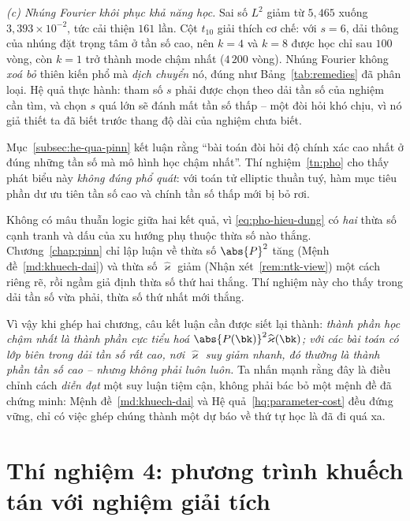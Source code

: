 \emph{(c) Nhúng Fourier khôi phục khả năng học.} Sai số $L^2$ giảm từ $5{,}465$
xuống $3{,}393\times10^{-2}$, tức cải thiện $161$ lần. Cột $t_{10}$ giải thích cơ
chế: với $s = 6$, dải thông của nhúng đặt trọng tâm ở tần số cao, nên $k = 4$ và
$k = 8$ được học chỉ sau $100$ vòng, còn $k = 1$ trở thành mode chậm nhất
($4\,200$ vòng). Nhúng Fourier không \emph{xoá bỏ} thiên kiến phổ mà \emph{dịch
chuyển} nó, đúng như Bảng~\ref{tab:remedies} đã phân loại. Hệ quả thực hành: tham
số $s$ phải được chọn theo dải tần số của nghiệm cần tìm, và chọn $s$ quá lớn sẽ
đánh mất tần số thấp -- một đòi hỏi khó chịu, vì nó giả thiết ta đã biết trước
thang độ dài của nghiệm chưa biết.
 
\begin{nhanxet}
\label{nx:hieu-chinh}
Mục~\ref{subsec:he-qua-pinn} kết luận rằng ``bài toán đòi hỏi độ chính xác cao
nhất ở đúng những tần số mà mô hình học chậm nhất''.
Thí nghiệm~\ref{tn:pho} cho thấy phát biểu này \emph{không đúng phổ quát}: với
toán tử elliptic thuần tuý, hàm mục tiêu phần dư ưu tiên tần số cao và chính tần
số thấp mới bị bỏ rơi.
 
Không có mâu thuẫn logic giữa hai kết quả, vì \eqref{eq:pho-hieu-dung} có
\emph{hai} thừa số cạnh tranh và dấu của xu hướng phụ thuộc thừa số nào thắng.
Chương~\ref{chap:pinn} chỉ lập luận về thừa số $\abs{P}^2$ tăng
(Mệnh đề~\ref{md:khuech-dai}) và thừa số $\widehat{\varkappa}$ giảm
(Nhận xét~\ref{rem:ntk-view}) một cách riêng rẽ, rồi ngầm giả định thừa số thứ hai
thắng. Thí nghiệm này cho thấy trong dải tần số vừa phải, thừa số thứ nhất mới
thắng.
 
Vì vậy khi ghép hai chương, câu kết luận cần được siết lại thành: \emph{thành phần học chậm nhất là thành phần cực tiểu hoá $\abs{P(\bk)}^{2} \widehat{\varkappa}(\bk)$; với các bài toán có lớp biên trong dải tần số rất cao, nơi $\widehat{\varkappa}$ suy giảm nhanh, đó thường là thành phần tần số cao -- nhưng không phải luôn luôn.} Ta nhấn mạnh rằng đây là điều chỉnh cách \emph{diễn đạt} một suy luận tiệm cận, không phải bác bỏ một mệnh đề đã chứng minh: Mệnh đề~\ref{md:khuech-dai} và Hệ quả~\ref{hq:parameter-cost} đều đứng vững, chỉ có việc ghép chúng thành một dự báo về thứ tự học là đã đi quá xa.
\end{nhanxet}
 
\section{Thí nghiệm 4: phương trình khuếch tán với nghiệm giải tích}
\label{sec:tn4}

